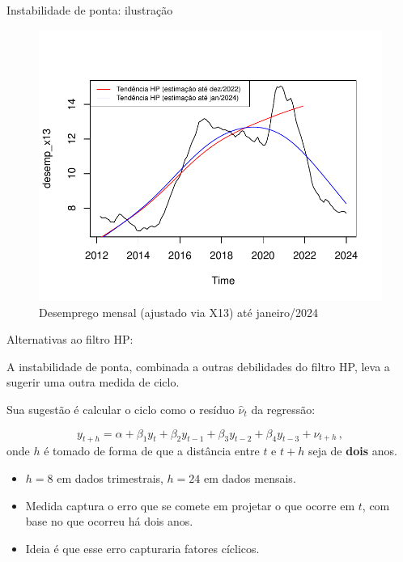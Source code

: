 \documentclass[11pt]{beamer}
\newenvironment{halfwideitemize}{\itemize\addtolength{\itemsep}{0.5em}}{\enditemize}
\begin{document}
\begin{frame}{Instabilidade de ponta: ilustração}
	\begin{figure}
		\caption{Desemprego mensal (ajustado via X13) até janeiro/2024}
		\includegraphics[scale=0.7]{graficos/instabilidade.pdf}
	\end{figure}
\end{frame}

\begin{frame}{Alternativas ao filtro HP: \citet{Hamilton2019}}
	\begin{halfwideitemize}
		\item A instabilidade de ponta, combinada a outras debilidades do filtro HP, leva \citet{Hamilton2019} a sugerir uma outra medida de ciclo.
		\item Sua sugestão é calcular o ciclo como o resíduo $\hat{\nu}_t$ da regressão:
		
		$$y_{t+h} = \alpha+\beta_1 y_{t} + \beta_2 y_{t-1} + \beta_3 y_{t-2} + \beta_4 y_{t-3} + \nu_{t+h} \, ,$$
		onde $h$ é tomado de forma de que a distância entre $t$ e $t+h$ seja de \textbf{dois} anos.
		\begin{itemize}
			\item $h=8$ em dados trimestrais, $h=24$ em dados mensais.
			\item Medida captura o erro que se comete em projetar o que ocorre em $t$, com base no que ocorreu há dois anos.
			\item Ideia é que esse erro capturaria fatores cíclicos.
		\end{itemize}
	\end{halfwideitemize}
\end{frame}
\end{document}
